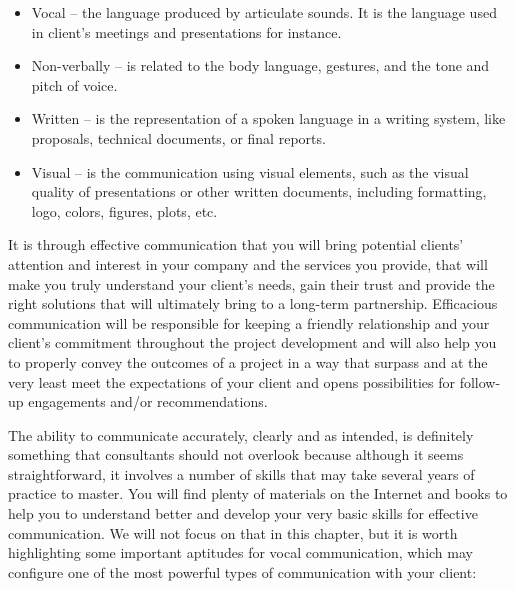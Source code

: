 \documentclass[
]{book}
\begin{document}
\begin{itemize}
\item
  Vocal -- the language produced by articulate sounds. It is the language used in client's meetings and presentations for instance.
\item
  Non-verbally -- is related to the body language, gestures, and the tone and pitch of voice.
\item
  Written -- is the representation of a spoken language in a writing system, like proposals, technical documents, or final reports.
\item
  Visual -- is the communication using visual elements, such as the visual quality of presentations or other written documents, including formatting, logo, colors, figures, plots, etc.
\end{itemize}

It is through effective communication that you will bring potential clients' attention and interest in your company and the services you provide, that will make you truly understand your client's needs, gain their trust and provide the right solutions that will ultimately bring to a long-term partnership. Efficacious communication will be responsible for keeping a friendly relationship and your client's commitment throughout the project development and will also help you to properly convey the outcomes of a project in a way that surpass and at the very least meet the expectations of your client and opens possibilities for follow-up engagements and/or recommendations.

The ability to communicate accurately, clearly and as intended, is definitely something that consultants should not overlook because although it seems straightforward, it involves a number of skills that may take several years of practice to master. You will find plenty of materials on the Internet and books to help you to understand better and develop your very basic skills for effective communication. We will not focus on that in this chapter, but it is worth highlighting some important aptitudes for vocal communication, which may configure one of the most powerful types of communication with your client:
\end{document}

